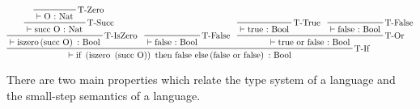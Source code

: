 \begin{frame}[c,shrink=10]

\[\prftree[r]{T-If}
  {\prftree[r]{T-IsZero}
    {\prftree[r]{T-Succ}
      {\prftree[r]{T-Zero}
        {}
        {\vdash \text{O} ~{:}~ \text{Nat} }
      }
      {\vdash \text{succ}~\text{O} ~{:}~ \text{Nat} }
    }
    {\vdash \text{iszero} \left( \text{succ} ~ \text{O} \right) ~{:}~ \text{Bool}}
  }
  {\prftree[r]{T-False}
    {}
    {\vdash \text{false} ~{:}~ \text{Bool}}
  }
  {\prftree[r]{T-Or}
    {\prftree[r]{T-True}
      {}
      {\vdash \text{true} ~{:}~ \text{Bool}}
    }
    {\prftree[r]{T-False}
      {}
      {\vdash \text{false} ~{:}~ \text{Bool}}
    }
    {\vdash \text{true}~\text{or}~\text{false} ~{:}~ \text{Bool}}
  }
  {\vdash \text{if}~\left(\text{iszero}~\left(\text{succ}~\text{O}\right)\right)~\text{then}~\text{false}~\text{else}\left(\text{false}~\text{or}~\text{false}\right) ~{:}~ \text{Bool}}\]

\end{frame}

\begin{frame}[c]
  There are two main properties which relate the type system of a language and
  the small-step semantics of a language.
\end{frame}

